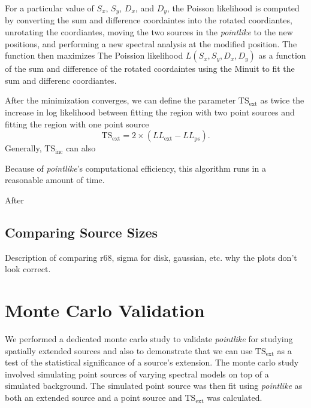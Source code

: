 \documentclass[preprint]{aastex}
\newcommand{\tsext}{\ensuremath{\text{TS}_\text{ext}}\xspace}
\newcommand{\tsinc}{\ensuremath{\text{TS}_\text{inc}}\xspace}
\newcommand{\pointlike}{{\em pointlike}\xspace}
\begin{document}
For a particular value of $S_x$, $S_y$, $D_x$, and $D_y$, the Poisson
likelihood is computed by converting the sum and difference coordaintes
into the rotated coordiantes, unrotating the coordiantes, moving the
two sources in the \pointlike to the new positions, and performing a new
spectral analysis at the modified position.  The function then maximizes
The Poission likelihood $L(S_x,S_y,D_x,D_y)$ as a function of the sum
and difference of the rotated coordaintes using the Minuit to fit the
sum and differenc coordiantes\cite{Minuit reference}.

After the minimization converges, we can define the 
parameter $\tsext$ as twice the 
increase
in log likelihood between fitting the region with
two point sources and fitting the region with one point source
\begin{equation}
  \tsext=2\times(LL_\text{ext}-LL_\text{ps}).
\end{equation}
Generally, \tsinc can also




Because of \pointlike's computational efficiency, this algorithm
runs in a reasonable amount of time.

After

\subsection{Comparing Source Sizes}

Description of comparing r68, sigma for disk, gaussian, etc.
why the plots don't look correct.

\section{Monte Carlo Validation}\label{monte_carlo_validation}


We performed a dedicated monte carlo study to validate \pointlike for
studying spatially extended sources and also to demonstrate that we can
use $\tsext$ as a test of the statistical significance
of a source's extension.  The monte carlo study involved simulating point
sources of varying spectral models on top of a simulated background. The
simulated point source was then fit using \pointlike as both an extended
source and a point source and $\tsext$ was calculated.
\end{document}

